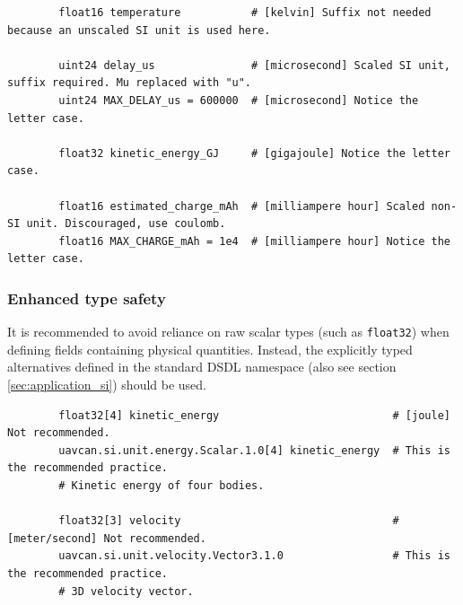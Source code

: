 \begin{remark}
    \begin{verbatim}
        float16 temperature           # [kelvin] Suffix not needed because an unscaled SI unit is used here.

        uint24 delay_us               # [microsecond] Scaled SI unit, suffix required. Mu replaced with "u".
        uint24 MAX_DELAY_us = 600000  # [microsecond] Notice the letter case.

        float32 kinetic_energy_GJ     # [gigajoule] Notice the letter case.

        float16 estimated_charge_mAh  # [milliampere hour] Scaled non-SI unit. Discouraged, use coulomb.
        float16 MAX_CHARGE_mAh = 1e4  # [milliampere hour] Notice the letter case.
    \end{verbatim}
\end{remark}

\subsubsection{Enhanced type safety}

It is recommended to avoid reliance on raw scalar types (such as \verb|float32|)
when defining fields containing physical quantities.
Instead, the explicitly typed alternatives defined in the standard DSDL namespace
 (also see section \ref{sec:application_si}) should be used.

\begin{remark}
    \begin{verbatim}
        float32[4] kinetic_energy                           # [joule] Not recommended.
        uavcan.si.unit.energy.Scalar.1.0[4] kinetic_energy  # This is the recommended practice.
        # Kinetic energy of four bodies.

        float32[3] velocity                                 # [meter/second] Not recommended.
        uavcan.si.unit.velocity.Vector3.1.0                 # This is the recommended practice.
        # 3D velocity vector.
    \end{verbatim}
\end{remark}
